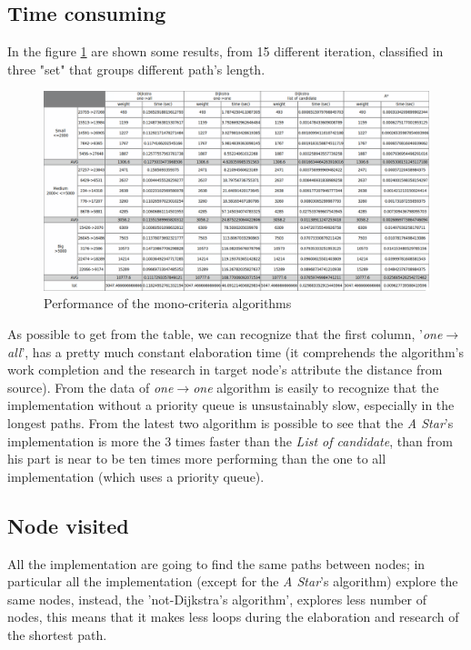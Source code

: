 \documentclass[a4paper,12pt]{report}
\begin{document}
\subsection{Time consuming} 
In the figure \ref{fig:monoCriteriaOutput} are shown some results, from 15 different iteration, classified in three "set" that groups different path's length.
\begin{figure}[H]
	\centering
	\includegraphics[width=\linewidth]{monoCriteriaOutput.png}
	\caption{Performance of the mono-criteria algorithms}
	\label{fig:monoCriteriaOutput}
\end{figure}
As possible to get from the table, we can recognize that the first column, '\textit{one$\to$all}', has a pretty much constant elaboration time (it comprehends the algorithm's work completion and the research in target node's attribute the distance from source). From the data of \textit{one$\to$one} algorithm is easily to recognize that the implementation without a priority queue is unsustainably slow, especially in the longest paths. From the latest two algorithm is possible to see that the \textit{A Star}'s implementation is more the 3 times faster than the \textit{List of candidate}, than from his part is near to be ten times more performing than the one to all implementation (which uses a priority queue).

\subsection{Node visited}

All the implementation are going to find the same paths between nodes; in particular all the implementation (except for the \textit{A Star}'s algorithm) explore the same nodes, instead, the 'not-Dijkstra's algorithm', explores less number of nodes, this means that it makes less loops during the elaboration and research of the shortest path.
\end{document}
